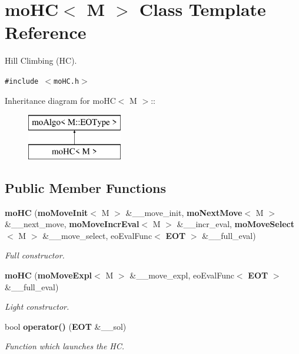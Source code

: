 \section{mo\-HC$<$ M $>$ Class Template Reference}
\label{classmo_h_c}
Hill Climbing (HC).  


{\tt \#include $<$mo\-HC.h$>$}

Inheritance diagram for mo\-HC$<$ M $>$::\begin{figure}[H]
\begin{center}
\leavevmode
\includegraphics[height=2cm]{classmo_h_c}
\end{center}
\end{figure}
\subsection*{Public Member Functions}
\begin{CompactItemize}
\item 
{\bf mo\-HC} ({\bf mo\-Move\-Init}$<$ M $>$ \&\_\-\_\-move\_\-init, {\bf mo\-Next\-Move}$<$ M $>$ \&\_\-\_\-next\_\-move, {\bf mo\-Move\-Incr\-Eval}$<$ M $>$ \&\_\-\_\-incr\_\-eval, {\bf mo\-Move\-Select}$<$ M $>$ \&\_\-\_\-move\_\-select, eo\-Eval\-Func$<$ {\bf EOT} $>$ \&\_\-\_\-full\_\-eval)
\begin{CompactList}\small\item\em Full constructor. \item\end{CompactList}\item 
{\bf mo\-HC} ({\bf mo\-Move\-Expl}$<$ M $>$ \&\_\-\_\-move\_\-expl, eo\-Eval\-Func$<$ {\bf EOT} $>$ \&\_\-\_\-full\_\-eval)
\begin{CompactList}\small\item\em Light constructor. \item\end{CompactList}\item 
bool {\bf operator()} ({\bf EOT} \&\_\-\_\-sol)
\begin{CompactList}\small\item\em Function which launches the HC. \item\end{CompactList}\end{CompactItemize}
